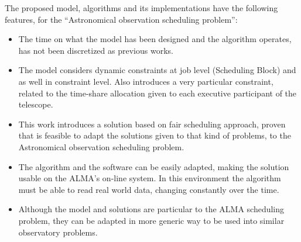 The proposed model, algorithms and its implementations have the following features, for the ``Astronomical observation scheduling problem'':
\begin{itemize}
\item The time on what the model has been designed and the algorithm operates, has not been discretized as previous works.

\item The model considers dynamic constraints at job level (Scheduling Block) and as well in constraint level. Also introduces a very particular constraint, related to the time-share allocation given to each executive participant of the telescope.

\item This work introduces a solution based on fair scheduling approach, proven that is feasible to adapt the solutions given to that kind of problems, to the Astronomical observation scheduling problem.

\item The algorithm and the software can be easily adapted, making the solution usable on the ALMA's on-line system. In this environment the algorithm must be able to read real world data, changing constantly over the time. 

\item Although the model and solutions are particular to the ALMA scheduling problem, they can be adapted in more generic way to be used into similar observatory problems.

\end{itemize} 

